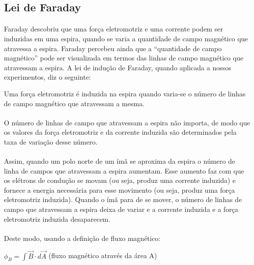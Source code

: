 \documentclass[a4paper, 12pt]{article}
\begin{document}
    \subsection{Lei de Faraday}

\paragraph{}Faraday descobriu que uma força eletromotriz e uma corrente podem ser induzidas em uma espira, quando se varia a quantidade de campo magnético que atravessa a espira. Faraday percebeu ainda que a “quantidade de campo magnético” pode ser visualizada em termos das linhas de campo magnético que atravessam a espira. A lei de indução de Faraday, quando aplicada a
nossos experimentos, diz o seguinte:
\\
\begin{mdframed}[backgroundcolor=gray!20]
	\begin{center}
		Uma força eletromotriz é induzida na espira quando varia-se o número de linhas de campo magnético que atravessam a mesma.
		\end{center}
\end{mdframed}

\paragraph{}O número de linhas de campo que atravessam a espira não importa, de modo que os valores da força eletromotriz e da corrente induzida são determinados pela taxa de variação desse número.

\paragraph{}Assim, quando um polo norte de um ímã se aproxima da espira o número de linha de campos que atravessam a espira aumentam. Esse aumento faz com que os elétrons de condução se movam (ou seja, produz uma corrente induzida) e fornece a energia necessária para esse movimento (ou seja, produz uma força eletromotriz induzida). Quando o ímã para de se mover, o número de linhas de campo que atravessam a espira deixa de variar e a corrente induzida e a força eletromotriz induzida desaparecem.

\paragraph{}Deste modo, usando a definição de fluxo magnético:  
\\
\begin{mdframed}[backgroundcolor=gray!20]
	\begin{center}
		$\phi_B = \int \overrightarrow{B} \cdot d\overrightarrow{A} $ (fluxo magnético através da área A)
		\end{center}
\end{mdframed}
\end{document}
